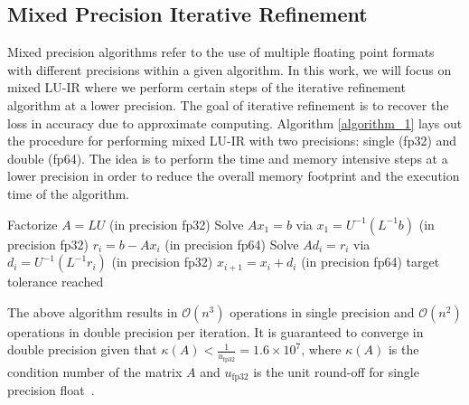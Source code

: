 \documentclass[a4paper,12pt]{article}
\begin{document}
\subsection{Mixed Precision Iterative Refinement}
Mixed precision algorithms refer to the use of multiple floating point formats with different precisions within a given algorithm. In this work, we will focus on mixed LU-IR where we perform certain steps of the iterative refinement algorithm at a lower precision. The goal of iterative refinement is to recover the loss in accuracy due to approximate computing. Algorithm \ref{algorithm_1} lays out the procedure for performing mixed LU-IR with two precisions: single (fp32) and double (fp64). The idea is to perform the time and memory intensive steps at a lower precision in order to reduce the overall memory footprint and the execution time of the algorithm.
\begin{algorithm}
	\caption{Mixed LU-IR}
	\label{algorithm_1}
	\begin{algorithmic}[1]
		\STATE Factorize $A=LU$ \hfill (in precision fp32)
		\STATE Solve $Ax_1=b$ via $x_1=U^{-1}(L^{-1}b)$ \hfill (in precision fp32)
		\REPEAT  
		\STATE \quad $r_i = b - Ax_i$ \hfill (in precision fp64)
		\STATE \quad Solve $Ad_i=r_i$ via $d_i=U^{-1}(L^{-1}r_i)$ \hfill (in precision fp32)
		\STATE \quad $x_{i+1} = x_i + d_i$ \hfill (in precision fp64)\;
		\UNTIL target tolerance reached
	\end{algorithmic}
\end{algorithm}

The above algorithm results in $\mathcal{O}(n^3)$ operations in single
precision and $\mathcal{O}(n^2)$ operations in double precision per
iteration. It is guaranteed to converge in double precision given that
$\kappa(A) < \frac{1}{u_{\text{fp32}}}=1.6 \times 10^7$, where
$\kappa(A)$ is the condition number of the matrix $A$ and
$u_{\text{fp32}}$ is the unit round-off for single precision
float~\citep{a.b.h.l.:22,c.h:18}.
\end{document}
